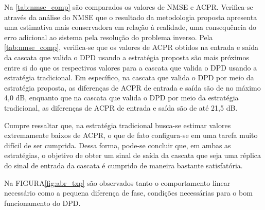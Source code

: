 Na \autoref{tab:nmse_comp} são comparados os valores de NMSE e ACPR. Verifica-se através da análise do NMSE que o resultado da metodologia proposta apresenta uma estimativa mais conservadora em relação à realidade, uma consequência do erro adicional ao sistema pela resolução do problema inverso. Pela \autoref{tab:nmse_comp}, verifica-se que os valores de ACPR obtidos na entrada e saída da cascata que valida o DPD usando a estratégia proposta são mais próximos entre si do que os respectivos valores para a cascata que valida o DPD usando a estratégia tradicional. Em específico, na cascata que valida o DPD por meio da estratégia proposta, as diferenças de ACPR de entrada e saída são de no máximo 4,0 dB, enquanto que na cascata que valida o DPD por meio da estratégia tradicional, as diferenças de ACPR de entrada e saída são de até 21,5 dB.

Cumpre ressaltar que, na estratégia tradicional busca-se estimar valores extremamente baixos de ACPR, o que de fato configura-se em uma tarefa muito difícil de ser cumprida. Dessa forma, pode-se concluir que, em ambas as estratégias, o objetivo de obter um sinal de saída da cascata que seja uma réplica do sinal de entrada da cascata é cumprido de maneira bastante satisfatória.

Na FIGURA\autoref{fig:abr_txp} são observados tanto o comportamento linear necessário como a pequena diferença de fase, condições necessárias para o bom funcionamento do DPD.

